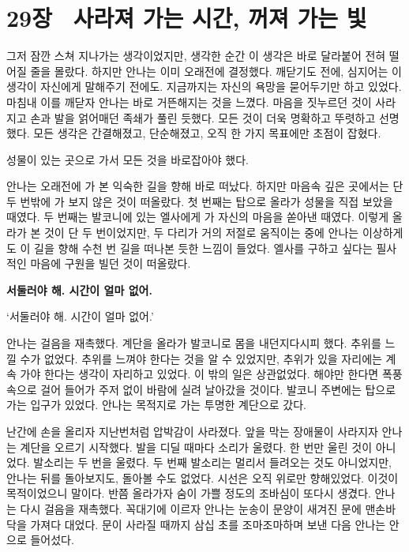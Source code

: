 

\chapter[29장  사라져 가는 시간, 꺼져 가는 빛][29장\hspace*{.5em}사라져 가는 시간, 꺼져 가는 빛]{29장 \ 사라져 가는 시간, 꺼져 가는 빛}



그저 잠깐 스쳐 지나가는 생각이었지만, 생각한 순간 이 생각은 바로 달라붙어 전혀 떨어질 줄을 몰랐다. 하지만 안나는 이미 오래전에 결정했다. 깨닫기도 전에, 심지어는 이 생각이 자신에게 말해주기 전에도. 지금까지는 자신의 욕망을 묻어두기만 하고 있었다. 마침내 이를 깨닫자 안나는 바로 거뜬해지는 것을 느꼈다. 마음을 짓누르던 것이 사라지고 손과 발을 얽어매던 족쇄가 풀린 듯했다. 모든 것이 더욱 명확하고 뚜렷하고 선명했다. 모든 생각은 간결해졌고, 단순해졌고, 오직 한 가지 목표에만 초점이 잡혔다.

성물이 있는 곳으로 가서 모든 것을 바로잡아야 했다.

안나는 오래전에 가 본 익숙한 길을 향해 바로 떠났다. 하지만 마음속 깊은 곳에서는 단 두 번밖에 가 보지 않은 것이 떠올랐다. 첫 번째는 탑으로 올라가 성물을 직접 보았을 때였다. 두 번째는 발코니에 있는 엘사에게 가 자신의 마음을 쏟아낸 때였다. 이렇게 올라가 본 것이 단 두 번이었지만, 두 다리가 거의 저절로 움직이는 중에 안나는 이상하게도 이 길을 향해 수천 번 길을 떠나본 듯한 느낌이 들었다. 엘사를 구하고 싶다는 필사적인 마음에 구원을 빌던 것이 떠올랐다.

\textbf{서둘러야 해. 시간이 얼마 없어.}

`서둘러야 해. 시간이 얼마 없어.'

안나는 걸음을 재촉했다. 계단을 올라가 발코니로 몸을 내던지다시피 했다. 추위를 느낄 수가 없었다. 추위를 느껴야 한다는 것을 알 수 있었지만, 추위가 있을 자리에는 계속 가야 한다는 생각이 자리하고 있었다. 이 밖의 일은 상관없었다. 해야만 한다면 폭풍 속으로 걸어 들어가 주저 없이 바람에 실려 날아갔을 것이다. 발코니 주변에는 탑으로 가는 입구가 있었다. 안나는 목적지로 가는 투명한 계단으로 갔다.

난간에 손을 올리자 지난번처럼 압박감이 사라졌다. 앞을 막는 장애물이 사라지자 안나는 계단을 오르기 시작했다. 발을 디딜 때마다 소리가 울렸다. 한 번만 울린 것이 아니었다. 발소리는 두 번을 울렸다. 두 번째 발소리는 멀리서 들려오는 것도 아니었지만, 안나는 뒤를 돌아보지도, 돌아볼 수도 없었다. 시선은 오직 위로만 향해있었다. 이것이 목적이었으니 말이다. 반쯤 올라가자 숨이 가쁠 정도의 조바심이 또다시 생겼다. 안나는 다시 걸음을 재촉했다. 꼭대기에 이르자 안나는 눈송이 문양이 새겨진 문에 맨손바닥을 가져다 대었다. 문이 사라질 때까지 삼십 초를 조마조마하며 보낸 다음 안나는 안으로 들어섰다.

